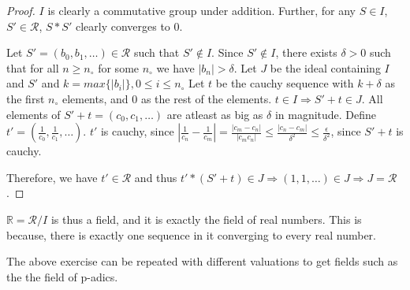 \begin{proof} \label{proof:cauchymax}
  $I$ is clearly a commutative group under addition.
  Further, for any $S \in I$, $S' \in \mathcal{R}$, $S*S'$ clearly converges to $0$.
  \par
  Let $S' = (b_{0}, b_{1}, \dots ) \in \mathcal{R}$ such that $S' \not \in I$.
  Since $S' \not \in I$, there exists $\delta > 0$ such that for all $n \geq n_{\circ}$ for some $n_{\circ}$ we have $|b_{n}| > \delta$.
  Let $J$ be the ideal containing $I$ and $S'$ and $k = max \{ |b_{i} | \}, 0 \leq i \leq n_{\circ}$
  Let $t$ be the cauchy sequence with $k + \delta$ as the first $n_{\circ}$ elements, and $0$ as the rest of the elements.
  $t \in I \Rightarrow S' + t \in J$.
  All elements of $S' + t = (c_{0}, c_{1}, \dots )$ are atleast as big as $\delta$ in magnitude.
  Define $t' = (\frac{1}{c_{0}}, \frac{1}{c_{1}}, \dots )$.
  $t'$ is cauchy, since $| \frac{1}{c_{n}} - \frac{1}{c_{m}}| = \frac{|c_{m} - c_{n}|}{|c_{m} c_{n}|} \leq \frac{|c_{n} - c_{m}|}{\delta^{2}} \leq \frac{\epsilon}{\delta^{2}}$, since $S' + t$ is cauchy.
  \par
  Therefore, we have $t' \in \mathcal{R}$ and thus $t' * (S' + t) \in J \Rightarrow (1, 1, \dots) \in J \Rightarrow J = \mathcal{R}$.
\end{proof}
$\mathbb{R} = \mathcal{R} \big/ {I}$ is thus a field, and it is exactly the field of real numbers.
This is because, there is exactly one sequence in it converging to every real number.
\par
The above exercise can be repeated with different valuations to get fields such as the the field of p-adics.
